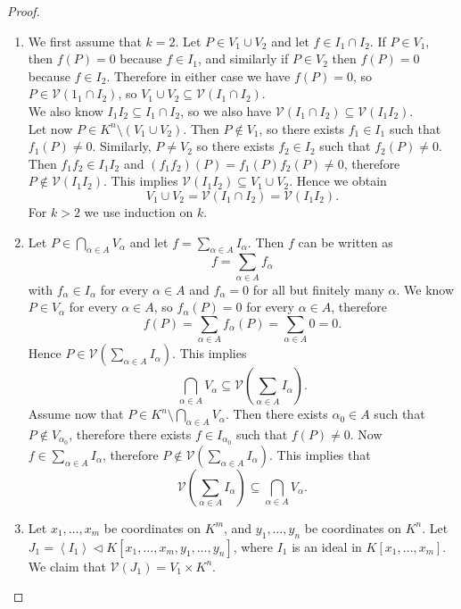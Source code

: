 \documentclass[titlepage]{article}
\theoremstyle{remark}
\newcommand{\idealof}{\vartriangleleft}
\newcommand{\idealgen}[1]{\ensuremath{\left\langle#1\right\rangle}}
\newcommand{\seq}[2]{\ensuremath{#1_1,\dots,#1_{#2}}}
\begin{document}
  \begin{proof}$ $
    \begin{enumerate}
      \item 
        We first assume that $k=2$. Let $P\in V_1\cup V_2$ and let $f\in I_1\cap I_2$. If $P\in V_1$, then $f(P)=0$ because $f\in I_1$, and similarly if $P\in V_2$ then $f(P)=0$ because $f\in I_2$. Therefore in either case we have $f(P)=0$, so $P\in\mathcal{V}(1_1\cap I_2)$, so $V_1\cup V_2\subseteq\mathcal{V}(I_1\cap I_2)$.\\
        We also know $I_1I_2\subseteq I_1\cap I_2$, so we also have $\mathcal{V}(I_1\cap I_2)\subseteq\mathcal{V}(I_1I_2)$.\\
        Let now $P\in K^n\setminus(V_1\cup V_2)$. 
        Then $P\notin V_1$, so there exists $f_1\in I_1$ such that $f_1(P)\ne0$. Similarly, $P\ne V_2$ so there exists $f_2\in I_2$ such that $f_2(P)\ne0$. 
        Then $f_1f_2\in I_1I_2$ and $(f_1 f_2)(P)=f_1(P)f_2(P)\ne0$, therefore $P\notin\mathcal{V}(I_1I_2)$. 
        This implies $\mathcal{V}(I_1I_2)\subseteq V_1\cup V_2$. Hence we obtain
          \[V_1\cup V_2=\mathcal{V}(I_1\cap I_2)=\mathcal{V}(I_1I_2).\]
        For $k>2$ we use induction on $k$.
      \item
        Let $P\in\bigcap\limits_{\alpha\in A}V_{\alpha}$ and let $f=\sum\limits_{\alpha\in A}I_{\alpha}$. Then $f$ can be written as 
        \[f=\sum_{\alpha\in A}f_{\alpha}\]
        with $f_{\alpha}\in I_{\alpha}$ for every $\alpha\in A$ and $f_\alpha=0$ for all but finitely many $\alpha$. We know $P\in V_\alpha$ for every $\alpha\in A$, so $f_{\alpha}(P)=0$ for every $\alpha\in A$, therefore
        \[f(P)=\sum_{\alpha\in A}f_{\alpha}(P)=\sum_{\alpha\in A}0=0.\]
        Hence $P\in\mathcal{V}\left(\sum\limits_{\alpha\in A}I_\alpha\right)$. This implies
        \[\bigcap_{\alpha\in A}V_\alpha\subseteq\mathcal{V}\left(\sum_{\alpha\in A}I_\alpha\right).\]
        Assume now that $P\in K^n\setminus\bigcap\limits_{\alpha\in A}V_\alpha$. Then there exists $\alpha_0\in A$ such that $P\notin V_{\alpha_0}$, therefore there exists $f\in I_{\alpha_0}$ such that $f(P)\ne 0$. Now $f\in\sum\limits_{\alpha\in A}I_\alpha$, therefore $P\notin\mathcal{V}\left(\sum\limits_{\alpha\in A}I_\alpha\right)$. This implies that
        \[\mathcal{V}\left(\sum_{\alpha\in A}I_\alpha\right)\subseteq\bigcap_{\alpha\in A}V_\alpha.\]
      \item 
        Let $\seq{x}{m}$ be coordinates on $K^m$, and $\seq{y}{n}$ be coordinates on $K^n$. Let $J_1=\idealgen{I_1}\idealof K[\seq{x}{m},\seq{y}{n}]$, where $I_1$ is an ideal in $K[\seq{x}{m}]$. We claim that $\mathcal{V}(J_1)=V_1\times K^n$.\\

\end{enumerate}
\end{proof}
\end{document}
